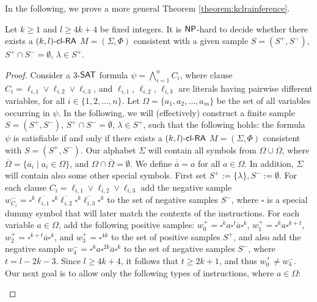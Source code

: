 In the following, we prove a more general Theorem \ref{theorem:kclrainference}.

\begin{theorem}\label{theorem:kclrainference}
Let $k \ge 1 $ and $l \ge 4k + 4$ be fixed integers.
It is $\NP$-hard to decide whether there exists a $\mbox{\sf $(k,l)$-\mbox{\sf cl-RA\/}}$ $M = (\Sigma, \Phi)$ consistent with a given sample $S = (S^+, S^-)$, $S^+ \cap S^- = \emptyset$, $\lambda \in S^+$.
\end{theorem}

\begin{proof}
Consider a $3$-$\textup{\sf SAT}$ formula $\psi = \bigwedge_{i=1}^n C_i$, where clause
$C_i = \ell_{i,1} \vee \ell_{i,2} \vee \ell_{i,3}$, and 
$\ell_{i,1}$, $\ell_{i,2}$, $\ell_{i,3}$
are literals having pairwise different variables, for all $i \in \{1, 2, \ldots, n\}$. 
Let $\Omega = \{a_1, a_2, \ldots, a_m\}$ be the set of all variables occurring in $\psi$.
In the following, we will (effectively) construct a finite sample $S = (S^+, S^-)$, 
$S^+ \cap S^- = \emptyset$, $\lambda \in S^+$, such that the following holds: 
the formula $\psi$ is satisfiable if and only if there exists a $\mbox{\sf $(k,l)$-\mbox{\sf cl-RA\/}}$ 
$M = (\Sigma, \Phi)$ consistent with $S = (S^+, S^-)$.
Our alphabet $\Sigma$ will contain all symbols from $\Omega \cup \overline{\Omega}$, where
$\overline{\Omega} = \{ \overline{a_i} \mid a_i \in \Omega \}$, and
$\Omega \cap \overline{\Omega} = \emptyset$. We define $\overline{\overline{a}} = a$
for all $a \in \Omega$. In addition, $\Sigma$ will contain also some 
other special symbols.
First set $S^+ := \{ \lambda \}, S^- := \emptyset$. For each clause 
$C_i = \ell_{i,1} \vee \ell_{i,2} \vee \ell_{i,3}$ add the negative sample
$w_{C_i}^- = \square^k \overline{\ell_{i,1}} \square^k \overline{\ell_{i,2}} 
\square^k \overline{\ell_{i,3}} \square^k$ to the set of negative samples $S^-$,
where $\square$ is a special dummy symbol that will later match the contexts
of the instructions. For each variable $a \in \Omega$, add the following 
positive samples:
$w_0^+ = \square^k a \square^t \overline{a} \square^k$, 
$w_1^+ = \square^k a \square^{k+t}$, 
$w_2^+ = \square^{k+t} \overline{a} \square^k$, and
$w_3^+ = \square^{4k}$
to the set of positive samples $S^+$,
and also add the negative sample 
$w_4^- = \square^k a \square^{2k}  \overline{a} \square^k$ 
to the set of negative samples $S^-$, where $t = l - 2k - 3$. 
Since $l \ge 4k + 4$, it follows that $t \ge 2k + 1$,
and thus $w_0^+ \neq w_4^-$. Our next goal is to allow 
only the following types of instructions, where $a \in \Omega$:
\begin{enumerate}

\end{enumerate}
\end{proof}
